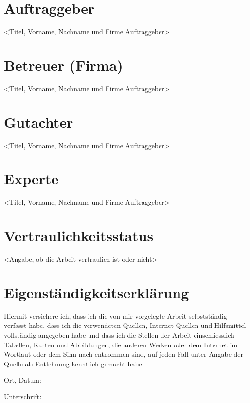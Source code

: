 \documentclass[11pt]{article}
\begin{document}
    \begin{independence}
        \section*{Auftraggeber}
        <Titel, Vorname, Nachname und Firme Auftraggeber>
        \section*{Betreuer (Firma)}
        <Titel, Vorname, Nachname und Firme Auftraggeber>
        \section*{Gutachter}
        <Titel, Vorname, Nachname und Firme Auftraggeber>
        \section*{Experte}
        <Titel, Vorname, Nachname und Firme Auftraggeber>
        \section*{Vertraulichkeitsstatus}
        <Angabe, ob die Arbeit vertraulich ist oder nicht>
        \vspace*{\fill}
        \section*{Eigenständigkeitserklärung}
            Hiermit versichere ich, dass ich die von mir vorgelegte Arbeit selbstständig verfasst habe, dass ich die verwendeten Quellen, Internet-Quellen und Hilfsmittel vollständig angegeben habe und dass ich die Stellen der Arbeit einschliesslich Tabellen, Karten und Abbildungen, die anderen Werken oder dem Internet im Wortlaut oder dem Sinn nach entnommen sind, auf jeden Fall unter Angabe der Quelle als Entlehnung kenntlich gemacht habe.
            
            \vspace{1cm}
            
            Ort, Datum:\\  
            \vspace{1cm}
            \hrulefill
            
            \vspace{1cm}
            
            Unterschrift:\\ 
            \vspace{1cm}
            \hrulefill 
    \end{independence}
    
\end{document}
